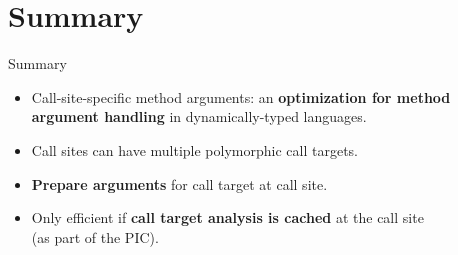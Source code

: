 \documentclass[xcolor=dvipsname]{beamer} %
\begin{document}
\section{Summary}
\begin{frame}{Summary}
\begin{itemize}
	\item Call-site-specific method arguments: an \textbf{optimization for method argument handling} in dynamically-typed languages.
	\item Call sites can have multiple polymorphic call targets.
	\item \textbf{Prepare arguments} for call target at call site.
	\item Only efficient if \textbf{call target analysis is cached} at the call site \\ (as part of the PIC).
\end{itemize}
\end{frame}
\end{document}
